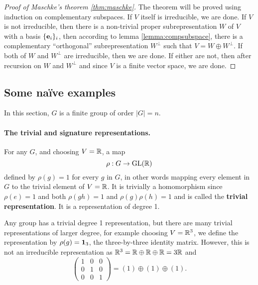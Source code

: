 	\begin{proof}[Proof of Maschke's theorem \ref{thm:maschke}]
		The theorem will be proved using induction on complementary subspaces. If $V$ itself is irreducible, we are done. If $V$ is not irreducible, then there is a non-trivial proper subrepresentation $W$ of $V$ with a basis $\{\mathbf{e}_i\}_i$, then according to lemma \ref{lemma:compsubspace}, there is a complementary ``orthogonal'' subrepresentation $W^\perp$ such that $V = W \oplus W^\perp$. If both of $W$ and $W^\perp$ are irreducible, then we are done. If either are not, then after recursion on $W$ and $W^\perp$ and since $V$ is a finite vector space, we are done.
	\end{proof}

\subsection{Some naïve examples}

In this section, $G$ is a finite group of order $|G| = n$. 

\paragraph*{The trivial and signature representations.}

	For any $G$, and choosing $V = \mathbb{R}$, a map
	\[
		\rho: G \rightarrow \text{GL}(\mathbb{R})
	\]
	defined by $ \rho(g) = 1$ for every $g$ in $G$, in other words mapping every element in $G$ to the trivial element of $V = \mathbb{R}$. It is trivially a homomorphism since $\rho(e)=1$ and both $\rho(gh)=1$ and $\rho(g)\rho(h)=1$ and is called the \textbf{trivial representation}. It is a representation of degree 1.
	
	
	Any group has a trivial degree 1 representation, but there are many trivial representations of larger degree, for example choosing $V = \mathbb{R}^3$, we define the representation by $\rho(g) = \mathbf{1}_3$, the three-by-three identity matrix. However, this is not an irreducible representation as $\mathbb{R}^3 = \mathbb{R} \oplus \mathbb{R} \oplus \mathbb{R} = 3\mathbb{R}$ and
	\[
		\begin{pmatrix} 1&0&0\\0&1&0\\0&0&1 \end{pmatrix} = (1)\oplus(1)\oplus(1).
	\]	
	
